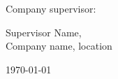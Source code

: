\begin{center}
\begin{flushleft}
                        \Large Company supervisor: \begin{minipage}[t]{0,6\textwidth}\Large Supervisor Name, \\\large Company name, location \end{minipage}
\end{flushleft}

              \vspace*{\fill}
                    \large \today		%

\end{center}